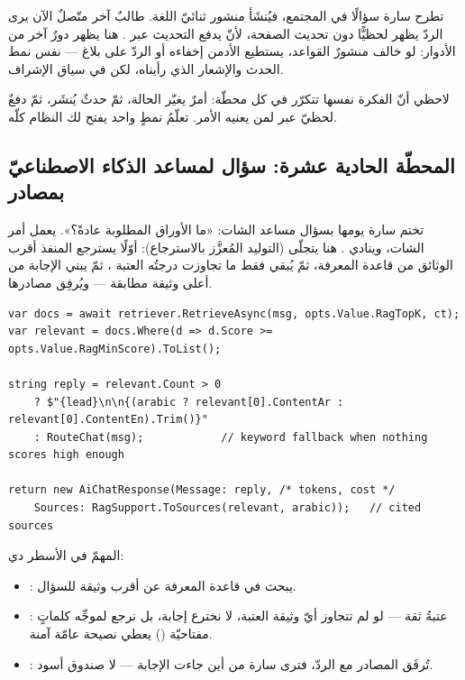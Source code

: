 تطرح سارة سؤالًا في المجتمع، فيُنشَأ منشور ثنائيّ اللغة. طالبٌ آخر متّصلٌ الآن يرى
الردّ يظهر لحظيًّا دون تحديث الصفحة، لأنّ  يدفع التحديث عبر
. هنا يظهر دورٌ آخر من الأدوار: لو خالف منشورٌ القواعد، يستطيع الأدمن
إخفاءه أو الردّ على بلاغ — نفس نمط الحدث والإشعار الذي رأيناه، لكن في سياق الإشراف.

\begin{note}
لاحظي أنّ الفكرة نفسها تتكرّر في كل محطّة: أمرٌ يغيّر الحالة، ثمّ حدثٌ يُنشَر، ثمّ
دفعٌ لحظيّ عبر  لمن يعنيه الأمر. تعلّمُ نمطٍ واحد يفتح لك النظام كلّه.
\end{note}

\subsection{المحطّة الحادية عشرة: سؤال لمساعد الذكاء الاصطناعيّ بمصادر}

تختم سارة يومها بسؤال مساعد الشات: «ما الأوراق المطلوبة عادةً؟». يعمل أمر الشات،
وينادي . هنا يتجلّى  (التوليد المُعزَّز
بالاسترجاع): أوّلًا يسترجع المنفذ  أقرب الوثائق من قاعدة
المعرفة، ثمّ يُبقي فقط ما تجاوزت درجتُه العتبة ، ثمّ يبني الإجابة
من أعلى وثيقة مطابقة — ويُرفِق مصادرها.

\begin{english}
\begin{lstlisting}[language={[Sharp]C}]
var docs = await retriever.RetrieveAsync(msg, opts.Value.RagTopK, ct);
var relevant = docs.Where(d => d.Score >= opts.Value.RagMinScore).ToList();

string reply = relevant.Count > 0
    ? $"{lead}\n\n{(arabic ? relevant[0].ContentAr : relevant[0].ContentEn).Trim()}"
    : RouteChat(msg);            // keyword fallback when nothing scores high enough

return new AiChatResponse(Message: reply, /* tokens, cost */
    Sources: RagSupport.ToSources(relevant, arabic));   // cited sources
\end{lstlisting}
\end{english}

المهمّ في الأسطر دي:
\begin{itemize}
\item {}: يبحث في قاعدة المعرفة عن أقرب  وثيقة للسؤال.
\item {}: عتبةُ ثقة — لو لم تتجاوز أيّ وثيقة العتبة، لا نخترع
إجابة، بل نرجع لموجِّه كلماتٍ مفتاحيّة () يعطي نصيحة عامّة آمنة.
\item {}: تُرفَق المصادر مع الردّ، فترى سارة
من أين جاءت الإجابة — لا صندوق أسود.
\end{itemize}

